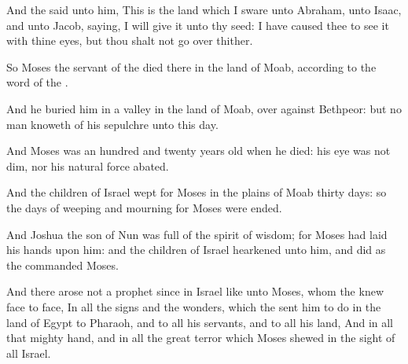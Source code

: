 \Verse And the \LORD said unto him, This is the land which I sware unto Abraham, unto Isaac, and unto Jacob, saying, I will give it unto thy seed: I have caused thee to see it with thine eyes, but thou shalt not go over thither.

\Verse So Moses the servant of the \LORD died there in the land of Moab, according to the word of the \LORD.

\Verse And he buried him in a valley in the land of Moab, over against Bethpeor: but no man knoweth of his sepulchre unto this day.

\Verse And Moses was an hundred and twenty years old when he died: his eye was not dim, nor his natural force abated.

\Verse And the children of Israel wept for Moses in the plains of Moab thirty days: so the days of weeping and mourning for Moses were ended.

\Verse And Joshua the son of Nun was full of the spirit of wisdom; for Moses had laid his hands upon him: and the children of Israel hearkened unto him, and did as the \LORD commanded Moses.

\Verse And there arose not a prophet since in Israel like unto Moses, whom the \LORD knew face to face, \Verse In all the signs and the wonders, which the \LORD sent him to do in the land of Egypt to Pharaoh, and to all his servants, and to all his land, \Verse And in all that mighty hand, and in all the great terror which Moses shewed in the sight of all Israel.

